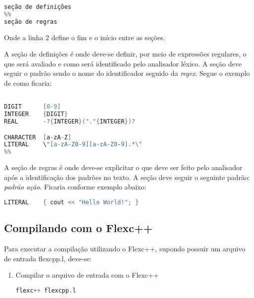 \begin{apendicesenv}
\begin{lstlisting}[language=c, label=apendiceCodigoFlex2, caption=Corpo do Arquivo do Flec++]
seção de definições
%%
seção de regras
\end{lstlisting}
\par
\indent Onde a linha $2$ define o fim e o início entre as seções.


A seção de definições é onde deve-se definir, por meio de expressões regulares, o que será avaliado e como será identificado pelo analisador léxico. A seção deve seguir o padrão sendo o nome do identificador seguido da \textit{regex}. Segue o exemplo de como ficaria:

\begin{lstlisting}[language=c, label=apendiceCodigoFlex3, caption=Seção de Definições]

DIGIT      [0-9]
INTEGER    {DIGIT}
REAL       -?{INTEGER}("."{INTEGER})?

CHARACTER  [a-zA-Z]
LITERAL    \"[a-zA-Z0-9][a-zA-Z0-9].*\"
%%
\end{lstlisting}


A seção de regras é onde deve-se explicitar o que deve ser feito pelo analisador após a identificação dos padrões no texto. A seção deve seguir o seguinte padrão: \textit{padrão    ação}. Ficaria conforme exemplo abaixo:

\begin{lstlisting}[language=c, label=apendiceCodigoFlex4, caption=Seção de Regras]
%%
LITERAL    { cout << "Hello World!"; }
\end{lstlisting}

\subsection{Compilando com o Flexc++}

Para executar a compilação utilizando o Flexc++, supondo possuir um arquivo de entrada flexcpp.l, deve-se:
\begin{enumerate}
\item Compilar o arquivo de entrada com o Flexc++


\begin{lstlisting}[language=c, label=apendiceCodigoFlex5, caption=Comando para Compilar Flexc++]
 flexc++ flexcpp.l
\end{lstlisting}


\end{enumerate}
\end{apendicesenv}
